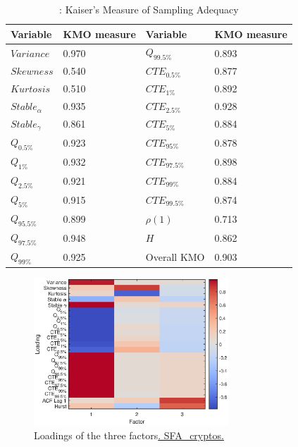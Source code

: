 \begin{table}[H]
\centering
\caption{: Kaiser's Measure of Sampling Adequacy}
   \label{table:table_3}
\small{
\begin{tabular}{llll} \hline \hline
Variable & KMO measure & Variable    & KMO measure \\ \hline
$Variance$         & 0.970       &  $Q_{99.5\%}$           & 0.893       \\
$Skewness$         & 0.540       &  $CTE_{0.5\%}$          & 0.877       \\
$Kurtosis$         & 0.510       &   $CTE_{1\%}$          & 0.892       \\
$Stable_\alpha$        & 0.935       &   $CTE_{2.5\%}$          & 0.928       \\
$Stable_\gamma$           & 0.861       &  $CTE_{5\%}$           & 0.884       \\
$Q_{0.5\%}$         & 0.923       &    $CTE_{95\%}$         & 0.878       \\
$Q_{1\%}$         & 0.932       &      $CTE_{97.5\%}$       & 0.898       \\
$Q_{2.5\%}$         & 0.921       &    $CTE_{99\%}$         & 0.884       \\
$Q_{5\%}$         & 0.915       &      $CTE_{99.5\%}$       & 0.874       \\
$Q_{95.5\%}$         & 0.899       &     ${\rho}(1)$        & 0.713       \\
$Q_{97.5\%}$         & 0.948       &     ${H}$        & 0.862       \\
$Q_{99\%}$         & 0.925       & Overall KMO & 0.903       \\ \hline\hline
\end{tabular}}

\end{table}




\begin{figure}[H]
\centering
\includegraphics[width=0.65\textwidth]{Fig/figure_4}
\caption{Loadings of the three factors\href{https://github.com/QuantLet/Genus_proximum_cryptos/tree/master/SFA_Cryptos}{. SFA\_cryptos.}}
   \label{fig:figure_4}
\end{figure}

